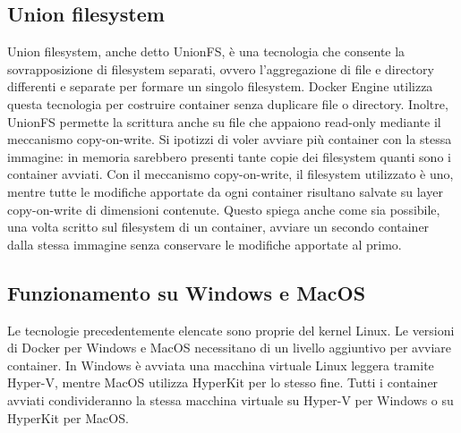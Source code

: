 \subsection{Union filesystem}
Union filesystem, anche detto UnionFS, è una tecnologia che consente la sovrapposizione di filesystem separati, ovvero l'aggregazione di file e directory differenti e separate per formare un singolo filesystem. Docker Engine utilizza questa tecnologia per costruire container senza duplicare file o directory. Inoltre, UnionFS permette la scrittura anche su file che appaiono read-only mediante il meccanismo copy-on-write. Si ipotizzi di voler avviare più container con la stessa immagine: in memoria sarebbero presenti tante copie dei filesystem quanti sono i container avviati. Con il meccanismo copy-on-write, il filesystem utilizzato è uno, mentre tutte le modifiche apportate da ogni container risultano salvate su layer copy-on-write di dimensioni contenute. Questo spiega anche come sia possibile, una volta scritto sul filesystem di un container, avviare un secondo container dalla stessa immagine senza conservare le modifiche apportate al primo.

\subsection{Funzionamento su Windows e MacOS}
Le tecnologie precedentemente elencate sono proprie del kernel Linux. Le versioni di Docker per Windows e MacOS necessitano di un livello aggiuntivo per avviare container. In Windows è avviata una macchina virtuale Linux leggera tramite Hyper-V, mentre MacOS utilizza HyperKit per lo stesso fine. Tutti i container avviati condivideranno la stessa macchina virtuale su Hyper-V per Windows o su HyperKit per MacOS.

